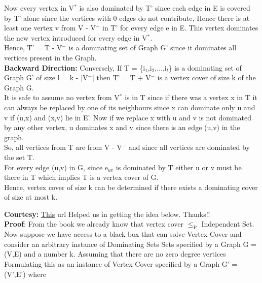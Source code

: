 \documentclass{report}
\begin{document}
 Now every vertex in V$^*$ is also dominated by T' since each edge in E is covered by T' alone since the vertices with 0 edges do not contribute, Hence there is at least one vertex v from V - V$^-$ in T' for every edge e in E. This vertex dominates the new vertex introduced for every edge in V$^*$.\\
 Hence, T' = T - V$^-$ is a dominating set of Graph G' since it dominates all vertices present in the Graph.\vspace*{0.2em}\\
 \textbf{Backward Direction:} Conversely, If T = \{i$_1$,i$_2$,$\dots$,i$_l$\} is a dominating set of Graph G' of size l = k - $|$V$^-|$ then T' = T + V$^-$ is a vertex cover of size k of the Graph G.\\
 It is safe to assume no vertex from V$^*$ is in T since if there was a vertex x in T it can always be replaced by one of its neighbours since x can dominate only u and v if (u,x) and (x,v) lie in E'. Now if we replace x with u and v is not dominated by any other vertex, u dominates x and v since there is an edge (u,v) in the graph.\\
 So, all vertices from T are from  V - V$^-$ and since all vertices are dominated by the set T.\\
 For every edge (u,v) in G, since e$_{uv}$ is dominated by T either u or v must be there in T which implies T is a vertex cover of G.\\
 {\large Hence, vertex cover of size k can be determined if there exists a dominating cover of size at most k.}
 \vspace*{1em}\\
 \textbf{Courtesy:} \href{https://cstheory.stackexchange.com/questions/25376/is-there-simple-reduction-dominating-set-to-vertex-cover}{This} url Helped us in getting the idea below. Thanks!!\\
 \textbf{Proof}: From the book we already know that vertex cover $\leq_\text{P}$ Independent Set. Now suppose we have access to a black box that can solve Vertex Cover and consider an arbitrary instance of Dominating Sets Sets specified by a Graph G = (V,E) and a number k.
 \newpage
 Assuming that there are no zero degree vertices\\
 Formulating this as an instance of Vertex Cover specified by a Graph G' = (V',E') where 
\end{document}
